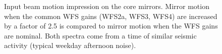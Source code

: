 \begin{figure}
\begin{centering}
\caption{Input beam motion impression on the core mirrors. Mirror
  motion when the common WFS gains (WFS2a, WFS3, WFS4) are increased by a
  factor of 2.5 is compared to mirror motion when the WFS gains are
  nominal. Both spectra come from a time of similar seismic activity
  (typical weekday afternoon noise).}
\label{fig:inputbeam_impression}
\end{centering}
\end{figure}

